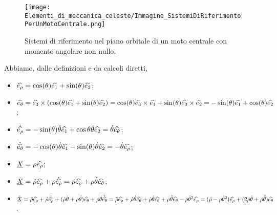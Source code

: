 \begin{figure}
	\texttt{[image: Elementi\_di\_meccanica\_celeste/Immagine\_SistemiDiRiferimentoPerUnMotoCentrale.png]}
	\centering
	\caption{Sistemi di riferimento nel piano orbitale di un moto centrale con momento angolare non nullo.}
\end{figure}
\Proof Abbiamo, dalle definizioni e da calcoli diretti,
\begin{itemize}
	\item $\widehat{e_\rho} = \cos(\theta) \widehat{e_1} + \sin(\theta)\widehat{e_2}$;
	\item $\widehat{e_\theta} = \widehat{e_3} \times (\cos(\theta) \widehat{e_1} + \sin(\theta)\widehat{e_2}) = \cos(\theta) \widehat{e_3} \times \widehat{e_1} + \sin(\theta) \widehat{e_3} \times \widehat{e_2} = - \sin(\theta) \widehat{e_1} + \cos(\theta)\widehat{e_2}$;
	\item $\dot{\widehat{e_\rho}} = - \sin(\theta) \dot{\theta} \widehat{e_1} + \cos{\theta} \dot{\theta} \widehat{e_2} = \dot{\theta}\widehat{e_\theta}$;
	\item $\dot{\widehat{e_\theta}} = - \cos(\theta) \dot{\theta} \widehat{e_1} - \sin(\theta) \dot{\theta} \widehat{e_2} = - \dot{\theta} \widehat{e_\rho}$;
	\item $\underline{X} = \rho \widehat{e_\rho}$;
	\item $\dot{\underline{X}} = \dot{\rho} \widehat{e_\rho} + \rho \dot{\widehat{e_\rho}} = \dot{\rho} \widehat{e_\rho} + \rho \dot{\theta} \widehat{e_\theta}$;
	\item $\ddot{\underline{X}} = \ddot{\rho} \widehat{e_\rho} + \dot{\rho} \dot{\widehat{e_\rho}} + (\dot{\rho} \dot{\theta} + \rho \ddot{\theta}) \widehat{e_\theta} + \rho \dot{\theta} \dot{\widehat{e_\theta}} = \ddot{\rho} \widehat{e_\rho} + \dot{\rho} \dot{\theta} \widehat{e_\theta} + \dot{\rho} \dot{\theta} \widehat{e_\theta} + \rho \ddot{\theta} \widehat{e_\theta} - \rho \dot{\theta}^2 \widehat{e_\rho} = (\ddot{\rho} - \rho \dot{\theta}^2) \widehat{e_\rho} + (2 \dot{\rho} \dot{\theta} + \rho \ddot{\theta}) \widehat{e_\theta}$. \EndProof
\end{itemize}
